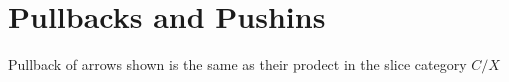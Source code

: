 \section{Pullbacks and Pushins}


Pullback of arrows shown is the same as their prodect in the slice category $C/X$